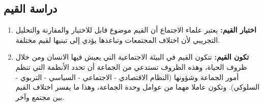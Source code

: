 \subsection{دراسة القيم}
\begin{enumerate}
    \item\textbf{اختبار القيم:}
        يعتبر علماء الاجتماع أن القيم موضوع قابل للاختبار والمقارنة والتحليل
        التجريبي لأن اختلاف المجتمعات وتباعدها يؤدي إلى تبنيها لقيم مختلفة.
    \item\textbf{تكون القيم:}
        تتكون القيم في البيئة الاجتماعية التي يعيش فيها الانسان ومن خلال ظروف
        الحياة، وهذه الظروف تستدعي من الجماعة أن تحدد الأنظمة التي تنظم أمور
        الجماعة وشؤونها (النظام الاقتصادي - الاجتماعي - السياسي - التربوي -
        السلوكي).
        وتكون عاملا مهما من عوامل وحدة الجماعة، وهذا ما يفسر اختلاف القيم بين
        مجتمع وآخر.
\end{enumerate}

